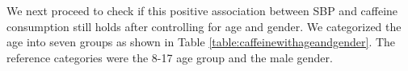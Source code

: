 \documentclass[]{imsart}
\newcommand{\bka}{\hbox{$\boldsymbol{\kappa$}}}
\begin{document}
\begin{comment}
\begin{table}[ht]
\centering
\begin{tabular}{rrrrr}

 &\textbf{mean} & \textbf{sd} & \textbf{2.5\%} & \textbf{97.5\%} \\
  \hline
  \multicolumn{5}{c}{Model parameters for $y_i\mid \cdots$}\\
 \multicolumn{5}{c}{(Caffeine) Spline coefficients}\\
  $\beta_1$ & 4.77 & 0.08 & 4.65 & 4.96 \\
 $\beta_2$ & 4.73 & 0.02 & 4.67 & 4.76 \\
 $\beta_3$ & 4.74 & 0.01 & 4.72 & 4.77 \\
 $\beta_4$ & 4.73 & 0.01 & 4.71 & 4.75 \\
 $\beta_5$ & 4.81 & 0.01 & 4.79 & 4.83 \\
 $\beta_6$ & 4.82 & 0.01 & 4.79 & 4.83 \\
  $\beta_7$ & 4.81 & 0.03 & 4.75 & 4.88 \\
  $\beta_8$ & 4.77 & 0.20 & 4.36 & 5.18 \\

      \multicolumn{5}{c}{Standard deviations}\\
  $\sigma_y$ & 0.14 & 0.00 & 0.14 & 0.14 \\
 $\sigma_\beta$ & 0.20 & 0.19 & 0.03 & 0.66 \\
  \hline
\multicolumn{5}{c}{Parameters of $\pi_i\mid y_i,\cdots$}\\
  $\bka_{x,1}$ (Intercept) & -7.33 & 0.35 & -8.02 & -6.63 \\
  $\kappa_y$ ($\log$ SBP) &-0.49 & 0.07 & -0.64 & -0.35 \\
  $\bka_{x,2}\ (\log(\hbox{caffeine}+1))$ & -0.08 & 0.00 & -0.09 & -0.07 \\
  $\sigma_\pi$ &0.86 & 0.01 & 0.85 & 0.88 \\
   \hline
\end{tabular}
\caption{\label{table:caffeine}
\end{table}
\end{comment}
We next proceed to check if this positive association between SBP and caffeine consumption still holds after controlling for
age and gender.  We categorized the age into seven groups
 as shown in Table
\ref{table:caffeinewithageandgender}. The reference categories were the 8-17 age group and the male gender.
\end{document}
